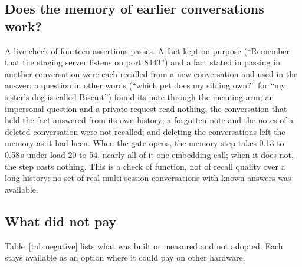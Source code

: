 \subsection{Does the memory of earlier conversations work?}
\label{sec:eval:recall}
A live check of fourteen assertions passes. A fact kept on purpose
(``Remember that the staging server listens on port 8443'') and a fact stated
in passing in another conversation were each recalled from a new conversation
and used in the answer; a question in other words (``which pet does my
sibling own?'' for ``my sister's dog is called Biscuit'') found its note
through the meaning arm; an impersonal question and a private request read
nothing; the conversation that held the fact answered from its own history;
a forgotten note and the notes of a deleted conversation were not recalled;
and deleting the conversations left the memory as it had been. When the gate
opens, the memory step takes 0.13 to 0.58\,s under load 20 to 54, nearly all
of it one embedding call; when it does not, the step costs nothing. This is a
check of function, not of recall quality over a long history: no set of real
multi-session conversations with known answers was available.



\subsection{What did not pay}
\label{sec:eval:negative}
Table~\ref{tab:negative} lists what was built or measured and not adopted.
Each stays available as an option where it could pay on other hardware.

